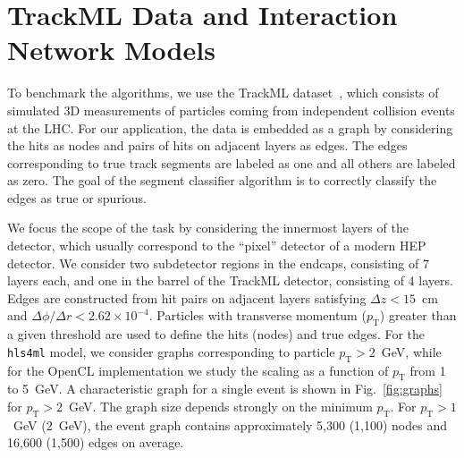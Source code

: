 \documentclass{article}
\newcommand{\TODO}[1]{\textcolor{red}{TODO: #1}}
\newcommand{\hlsfml}{\texttt{hls4ml}\xspace}
\newcommand{\pt}{\ensuremath{p_{\mathrm{T}}}\xspace}
\begin{document}
\section{TrackML Data and Interaction Network Models}
\label{sec:in}


To benchmark the algorithms, we use the TrackML dataset~\cite{Amrouche:2019wmx}, which consists of simulated 3D measurements of particles coming from independent collision events at the LHC.
For our application, the data is embedded as a graph by considering the hits as nodes and pairs of hits on adjacent layers as edges.
The edges corresponding to true track segments are labeled as one and all others are labeled as zero.
The goal of the segment classifier algorithm is to correctly classify the edges as true or spurious.

We focus the scope of the task by considering the innermost layers of the detector, which usually correspond to the ``pixel'' detector of a modern HEP detector. 
We consider two subdetector regions in the endcaps, consisting of 7 layers each, and one in the barrel of the TrackML detector, consisting of 4 layers.
Edges are constructed from hit pairs on adjacent layers satisfying $\Delta z < 15$~cm and $\Delta\phi / \Delta r < 2.62\times 10^{-4}$.
Particles with transverse momentum ($\pt$) greater than a given threshold are used to define the hits (nodes) and true edges.
For the \hlsfml model, we consider graphs corresponding to particle $\pt>2$~GeV, while for the OpenCL implementation we study the scaling as a function of $\pt$ from 1 to 5~GeV. 
A characteristic graph for a single event is shown in Fig.~\ref{fig:graphs} for $\pt>2$~GeV.
The graph size depends strongly on the minimum $\pt$.
For $\pt > 1$~GeV ($2$~GeV), the event graph contains approximately 5,300 (1,100) nodes and 16,600 (1,500) edges on average.
\end{document}
